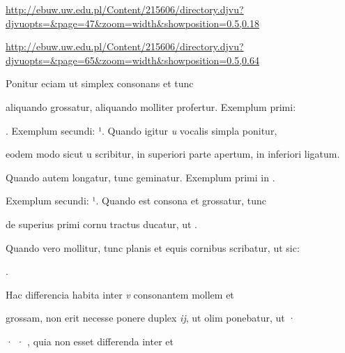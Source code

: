 

\newParkoszpage


{
\url{http://ebuw.uw.edu.pl/Content/215606/directory.djvu?djvuopts=&page=47&zoom=width&showposition=0.5,0.18}

\url{http://ebuw.uw.edu.pl/Content/215606/directory.djvu?djvuopts=&page=65&zoom=width&showposition=0.5,0.64}
}

\fullpreviouslines


{
\color{blue}
Ponitur eciam ut simplex consonans et tunc

}

\fulllines



aliquando grossatur, aliquando molliter profertur. Exemplum primi:  

. Exemplum secundi:  ¹. Quando igitur \textit{u} vocalis simpla ponitur,

eodem modo sicut u scribitur, in superiori parte apertum, in inferiori ligatum.

Quando autem longatur, tunc geminatur. Exemplum primi in  .



Exemplum secundi:  ¹. Quando est consona et grossatur, tunc

de superius primi cornu tractus ducatur, ut   .

Quando vero mollitur, tunc planis et equis cornibus scribatur, ut sic: 

\splitlines

 .

\indentK Hac differencia habita inter \textit{v} consonantem mollem et

\fulllines

grossam, non erit necesse ponere duplex \textit{ij}, ut olim ponebatur,  ut ·

· · , quia non esset differenda inter  et 

